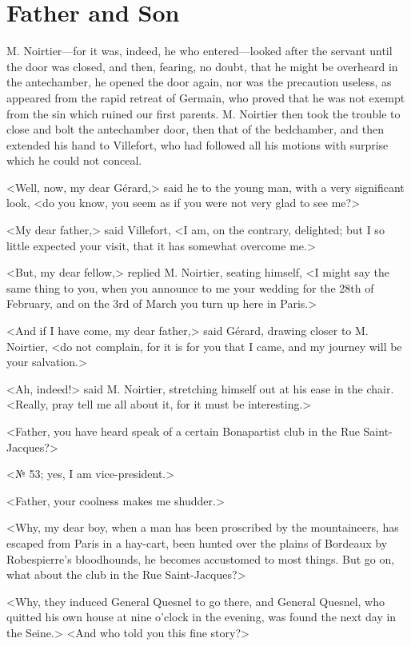\chapter{Father and Son} 
	
	\lettrine{M}{.} Noirtier—for it was, indeed, he who entered—looked after the servant until the door was closed, and then, fearing, no doubt, that he might be overheard in the antechamber, he opened the door again, nor was the precaution useless, as appeared from the rapid retreat of Germain, who proved that he was not exempt from the sin which ruined our first parents. M. Noirtier then took the trouble to close and bolt the antechamber door, then that of the bedchamber, and then extended his hand to Villefort, who had followed all his motions with surprise which he could not conceal. 

 <Well, now, my dear Gérard,> said he to the young man, with a very significant look, <do you know, you seem as if you were not very glad to see me?> 

 <My dear father,> said Villefort, <I am, on the contrary, delighted; but I so little expected your visit, that it has somewhat overcome me.> 

 <But, my dear fellow,> replied M. Noirtier, seating himself, <I might say the same thing to you, when you announce to me your wedding for the 28th of February, and on the 3rd of March you turn up here in Paris.> 

 <And if I have come, my dear father,> said Gérard, drawing closer to M. Noirtier, <do not complain, for it is for you that I came, and my journey will be your salvation.> 

 <Ah, indeed!> said M. Noirtier, stretching himself out at his ease in the chair. <Really, pray tell me all about it, for it must be interesting.> 

 <Father, you have heard speak of a certain Bonapartist club in the Rue Saint-Jacques?> 

 <№ 53; yes, I am vice-president.> 

 <Father, your coolness makes me shudder.> 

 <Why, my dear boy, when a man has been proscribed by the mountaineers, has escaped from Paris in a hay-cart, been hunted over the plains of Bordeaux by Robespierre's bloodhounds, he becomes accustomed to most things. But go on, what about the club in the Rue Saint-Jacques?> 

 <Why, they induced General Quesnel to go there, and General Quesnel, who quitted his own house at nine o'clock in the evening, was found the next day in the Seine.>  <And who told you this fine story?> 

